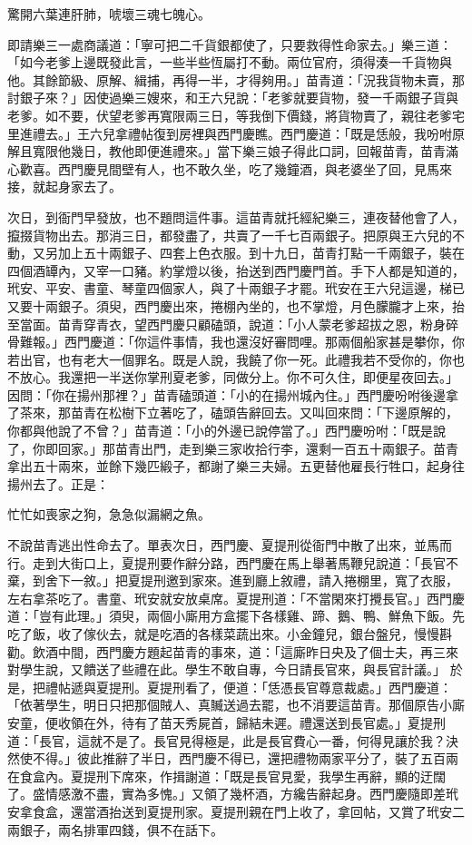 驚開六葉連肝肺，唬壞三魂七魄心。

即請樂三一處商議道：「寧可把二千貨銀都使了，只要救得性命家去。」樂三道：「如今老爹上邊既發此言，一些半些恆屬打不動。兩位官府，須得湊一千貨物與他。其餘節級、原解、緝捕，再得一半，才得夠用。」苗青道：「況我貨物未賣，那討銀子來？」因使過樂三嫂來，和王六兒說：「老爹就要貨物，發一千兩銀子貨與老爹。如不要，伏望老爹再寬限兩三日，等我倒下價錢，將貨物賣了，親往老爹宅里進禮去。」王六兒拿禮帖復到房裡與西門慶瞧。西門慶道：「既是恁般，我吩咐原解且寬限他幾日，教他即便進禮來。」當下樂三娘子得此口詞，回報苗青，苗青滿心歡喜。西門慶見間壁有人，也不敢久坐，吃了幾鐘酒，與老婆坐了回，見馬來接，就起身家去了。

次日，到衙門早發放，也不題問這件事。這苗青就托經紀樂三，連夜替他會了人，攛掇貨物出去。那消三日，都發盡了，共賣了一千七百兩銀子。把原與王六兒的不動，又另加上五十兩銀子、四套上色衣服。到十九日，苗青打點一千兩銀子，裝在四個酒罈內，又宰一口豬。約掌燈以後，抬送到西門慶門首。手下人都是知道的，玳安、平安、書童、琴童四個家人，與了十兩銀子才罷。玳安在王六兒這邊，梯已又要十兩銀子。須臾，西門慶出來，捲棚內坐的，也不掌燈，月色朦朧才上來，抬至當面。苗青穿青衣，望西門慶只顧磕頭，說道：「小人蒙老爹超拔之恩，粉身碎骨難報。」西門慶道：「你這件事情，我也還沒好審問哩。那兩個船家甚是攀你，你若出官，也有老大一個罪名。既是人說，我饒了你一死。此禮我若不受你的，你也不放心。我還把一半送你掌刑夏老爹，同做分上。你不可久住，即便星夜回去。」因問：「你在揚州那裡？」苗青磕頭道：「小的在揚州城內住。」西門慶吩咐後邊拿了茶來，那苗青在松樹下立著吃了，磕頭告辭回去。又叫回來問：「下邊原解的，你都與他說了不曾？」苗青道：「小的外邊已說停當了。」西門慶吩咐：「既是說了，你即回家。」那苗青出門，走到樂三家收拾行李，還剩一百五十兩銀子。苗青拿出五十兩來，並餘下幾匹緞子，都謝了樂三夫婦。五更替他雇長行牲口，起身往揚州去了。正是：

忙忙如喪家之狗，急急似漏網之魚。

不說苗青逃出性命去了。單表次日，西門慶、夏提刑從衙門中散了出來，並馬而行。走到大街口上，夏提刑要作辭分路，西門慶在馬上舉著馬鞭兒說道：「長官不棄，到舍下一敘。」把夏提刑邀到家來。進到廳上敘禮，請入捲棚里，寬了衣服，左右拿茶吃了。書童、玳安就安放桌席。夏提刑道：「不當閑來打攪長官。」西門慶道：「豈有此理。」須臾，兩個小廝用方盒擺下各樣雞、蹄、鵝、鴨、鮮魚下飯。先吃了飯，收了傢伙去，就是吃酒的各樣菜蔬出來。小金鐘兒，銀台盤兒，慢慢斟勸。飲酒中間，西門慶方題起苗青的事來，道：「這廝昨日央及了個士夫，再三來對學生說，又饋送了些禮在此。學生不敢自專，今日請長官來，與長官計議。」 於是，把禮帖遞與夏提刑。夏提刑看了，便道：「恁憑長官尊意裁處。」西門慶道：「依著學生，明日只把那個賊人、真贓送過去罷，也不消要這苗青。那個原告小廝安童，便收領在外，待有了苗天秀屍首，歸結未遲。禮還送到長官處。」夏提刑道：「長官，這就不是了。長官見得極是，此是長官費心一番，何得見讓於我？決然使不得。」彼此推辭了半日，西門慶不得已，還把禮物兩家平分了，裝了五百兩在食盒內。夏提刑下席來，作揖謝道：「既是長官見愛，我學生再辭，顯的迂闊了。盛情感激不盡，實為多愧。」又領了幾杯酒，方纔告辭起身。西門慶隨即差玳安拿食盒，還當酒抬送到夏提刑家。夏提刑親在門上收了，拿回帖，又賞了玳安二兩銀子，兩名排軍四錢，俱不在話下。

